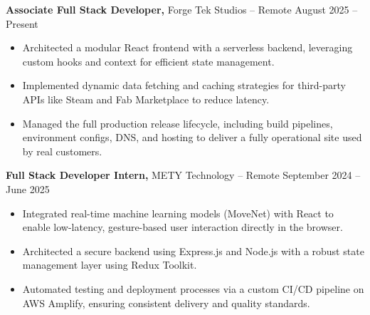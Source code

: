 \documentclass[11pt]{article}       %
\begin{document}
\textbf{Associate Full Stack Developer,} {Forge Tek Studios} -- Remote \hfill August 2025 -- Present \\
\vspace{-9pt}
\begin{itemize}
  \item Architected a modular React frontend with a serverless backend, leveraging custom hooks and context for efficient state management.
  \item Implemented dynamic data fetching and caching strategies for third-party APIs like Steam and Fab Marketplace to reduce latency.
  \item Managed the full production release lifecycle, including build pipelines, environment configs, DNS, and hosting to deliver a fully operational site used by real customers.
\end{itemize}

\textbf{Full Stack Developer Intern,} {METY Technology} -- Remote \hfill September 2024 -- June 2025 \\
\vspace{-9pt}
\begin{itemize}
  \item Integrated real-time machine learning models (MoveNet) with React to enable low-latency, gesture-based user interaction directly in the browser.
  \item Architected a secure backend using Express.js and Node.js with a robust state management layer using Redux Toolkit.
  \item Automated testing and deployment processes via a custom CI/CD pipeline on AWS Amplify, ensuring consistent delivery and quality standards.
\end{itemize}

\end{document}

